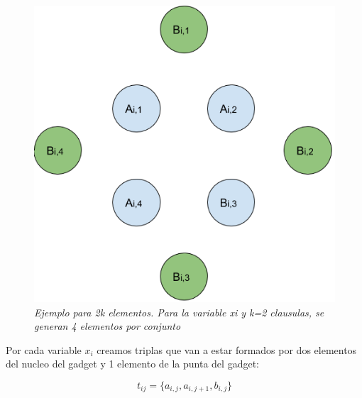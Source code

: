 \documentclass{article}
\begin{document}
\begin{figure}[h!]
    \begin{center} 
    \includegraphics[scale=0.3]{imagenes/ejemplo-3dm-gadget-xi.png}
    \caption{\small \sl Ejemplo para 2k elementos. Para la variable xi y k=2 clausulas, se generan 4 elementos por conjunto} 
    \end{center}
\end{figure}

Por cada variable \(x_i\) creamos triplas que van a estar formados por dos elementos del nucleo del gadget
y 1 elemento de la punta del gadget: 

\[
    t_{ij}=\{a_{i,j}, a_{i,j+1}, b_{i,j}\}
\]
\end{document}
